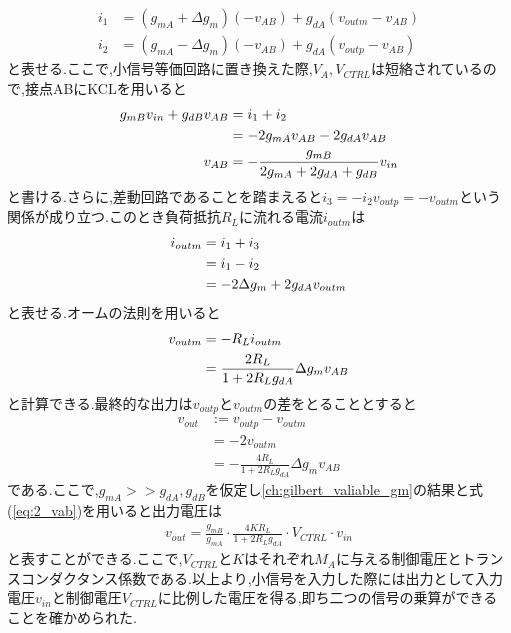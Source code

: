             \begin{align}
                i_{1}&=(g_{mA}+\Delta g_{m})(-v_{AB})+g_{dA}(v_{outm}-v_{AB})        \label{eq:2_i1}\\
                i_{2}&=(g_{mA}-\Delta g_{m})(-v_{AB})+g_{dA}(v_{outp}-v_{AB})        \label{eq:2_i2}
            \end{align}
            と表せる.ここで,小信号等価回路に置き換えた際,$V_{A},V_{CTRL}$は短絡されているので,接点ABにKCLを用いると
            \begin{align}
                g_{mB}v_{in}+g_{dB}v_{AB}&=i_{1}+i_{2}    \notag\\
                &=-2g_{mA}v_{AB}-2g_{dA}v_{AB}               \notag\\
                v_{AB}&=-\frac{g_{mB}}{2g_{mA}+2g_{dA}+g_{dB}}v_{in}     \label{eq:2_vab}
            \end{align}
            と書ける.さらに,差動回路であることを踏まえると\mbox{$i_{3}=-i_{2}$}\mbox{$v_{outp}=-v_{outm}$}という関係が成り立つ.このとき負荷抵抗$R_{L}$に流れる電流$i_{outm}$は
            \begin{align}
                i_{outm}&=i_{1}+i_{3}       \notag\\
                &=i_{1}-i_{2}   \notag\\
                &=-2\Delta g_{m}+2g_{dA}v_{outm}    \label{eq:2_ioutm}
            \end{align}
            と表せる.オームの法則を用いると
            \begin{align}
                v_{outm}&=-R_{L}i_{outm}    \notag\\
                &=\frac{ 2R_{L} }{1+2R_{L}g_{dA}}\Delta g_{m}v_{AB}     \notag
            \end{align}
            と計算できる.最終的な出力は$v_{outp}$と$v_{outm}$の差をとることとすると
            \begin{align*}
                v_{out}&:=v_{outp}-v_{outm}     \\
                &=-2v_{outm}                    \\
                &=-\frac{ 4R_{L} }{1+2R_{L}g_{dA}}\Delta g_{m}v_{AB}
            \end{align*}
            である.ここで,$g_{mA}>>g_{dA},g_{dB}$を仮定し\ref{ch:gilbert_valiable_gm}の結果と式(\ref{eq:2_vab})を用いると出力電圧は
            \begin{align}
                v_{out}=\frac{ g_{mB} }{ g_{mA} }\cdot \frac{ 4KR_{L} }{ 1+2R_{L}g_{dA} }\cdot V_{CTRL}\cdot v_{in}       \label{eq:2_vout}
            \end{align}
            と表すことができる.ここで,$V_{CTRL}$と$K$はそれぞれ$M_{A}$に与える制御電圧とトランスコンダクタンス係数である.以上より,小信号を入力した際には出力として入力電圧$v_{in}$と制御電圧$V_{CTRL}$に比例した電圧を得る,即ち二つの信号の乗算ができることを確かめられた.
            \newpage


